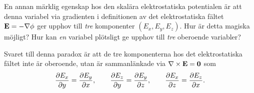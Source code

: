 En annan m{\"a}rklig egenskap hos den skal{\"a}ra elektrostatiska potentialen {\"a}r att denna variabel via gradienten i definitionen av det elektrostatiska f{\"a}ltet ${\bf E}=-\nabla\phi$ ger upphov till {\it tre} komponenter $(E_x,E_y,E_z)$. Hur {\"a}r detta magiska m{\"o}jligt? Hur kan {\it en} variabel pl{\"o}tsligt ge upphov till {\it tre} oberoende variabler?

Svaret till denna paradox {\"a}r att de tre komponenterna hos det elektrostatiska f{\"a}ltet inte {\"a}r oberoende, utan {\"a}r sammanl{\"a}nkade via $\nabla\times{\bf E}={\bf 0}$ som
$$
  {{\partial E_x}\over{\partial y}}={{\partial E_y}\over{\partial x}},\qquad
  {{\partial E_z}\over{\partial y}}={{\partial E_y}\over{\partial z}},\qquad
  {{\partial E_x}\over{\partial z}}={{\partial E_z}\over{\partial x}}.
$$
\vfill\eject

